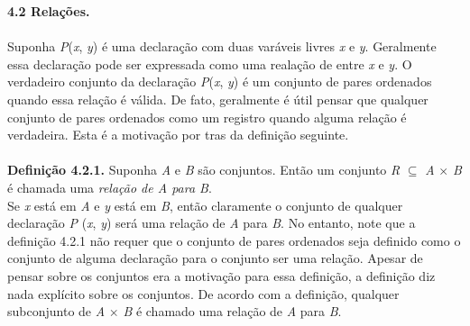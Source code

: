 {\textbf{\large 4.2 Relações.}}
\\
\\

Suponha \textit{P}(\textit{x}, \textit{y}) é uma declaração com duas varáveis livres \textit{x} e \textit{y}. Geralmente essa
declaração pode ser expressada como uma realação de entre \textit{x} e \textit{y}. O verdadeiro conjunto da declaração
\textit{P}(\textit{x}, \textit{y}) é um conjunto de pares ordenados quando essa relação é válida. De fato, geralmente é útil 
pensar que qualquer conjunto de pares ordenados como um registro quando alguma relação é verdadeira. Esta é a motivação por tras
da definição seguinte.
\\
\\

\textbf{Definição 4.2.1.} Suponha \textit{A} e \textit{B} são conjuntos. Então um conjunto \textit{R} $\subseteq$ \textit{A} 
$\times$ \textit{B} é chamada uma \textit{relação de A para B}.
\\
Se \textit{x} está em \textit{A} e \textit{y} está em \textit{B}, então claramente o conjunto de qualquer declaração \textit{P}
(\textit{x}, \textit{y}) será uma relação de \textit{A} para \textit{B}. No entanto, note que a definição 4.2.1 não requer que 
o conjunto de pares ordenados seja definido como o conjunto de alguma declaração para o conjunto ser uma relação. Apesar de pensar
sobre os conjuntos era a motivação para essa definição, a definição diz nada explícito sobre os conjuntos. De acordo com a definição,
qualquer subconjunto de \textit{A} $\times$ \textit{B} é chamado uma relação de \textit{A} para \textit{B}.
\\
\\

